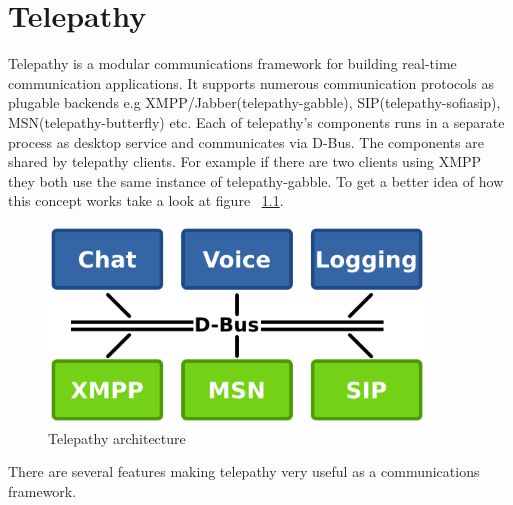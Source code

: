 \chapter{Telepathy}\label{chapter:telepathy}
Telepathy\cite{telepathy} is a modular communications framework for building real-time communication applications. It supports numerous communication protocols as plugable backends e.g XMPP/Jabber(telepathy-gabble), SIP(telepathy-sofiasip), MSN(telepathy-butterfly) etc. Each of telepathy's components runs in a separate process as desktop service and communicates via D-Bus. The components are shared by telepathy clients. For example if there are two clients using XMPP they both use the same instance of telepathy-gabble. To get a better idea of how this concept works take a look at figure ~\ref{fig:telepathyArchitecture}.\cite{TPWiki} 

\begin{figure}[ht]
\begin{center}
	\includegraphics[width=10cm]{fig/telepathy-architecture-overview.png}
	\caption{Telepathy architecture\cite{TPWiki}}
	\label{fig:telepathyArchitecture}
\end{center}
\end{figure}


There are several features making telepathy very useful as a communications framework.

